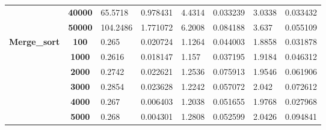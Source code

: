 \documentclass{article}
\begin{document}
\begin{table}[]
\begin{tabular}{|c|c|ll|ll|ll|}
                                           & \textbf{40000}                    & \multicolumn{1}{l|}{65.5718}       & 0.978431                          & \multicolumn{1}{l|}{4.4314}        & 0.033239                          & \multicolumn{1}{l|}{3.0338}        & 0.033432                          \\ \cline{2-8} 
                                           & \textbf{50000}                    & \multicolumn{1}{l|}{104.2486}      & 1.771072                          & \multicolumn{1}{l|}{6.2008}        & 0.084188                          & \multicolumn{1}{l|}{3.637}         & 0.055109                          \\ \hline
\multirow{15}{*}{\textbf{Merge\_sort}}     & \textbf{100}                      & \multicolumn{1}{l|}{0.265}         & 0.020724                          & \multicolumn{1}{l|}{1.1264}        & 0.044003                          & \multicolumn{1}{l|}{1.8858}        & 0.031878                          \\ \cline{2-8} 
                                           & \textbf{1000}                     & \multicolumn{1}{l|}{0.2616}        & 0.018147                          & \multicolumn{1}{l|}{1.157}         & 0.037195                          & \multicolumn{1}{l|}{1.9184}        & 0.046312                          \\ \cline{2-8} 
                                           & \textbf{2000}                     & \multicolumn{1}{l|}{0.2742}        & 0.022621                          & \multicolumn{1}{l|}{1.2536}        & 0.075913                          & \multicolumn{1}{l|}{1.9546}        & 0.061906                          \\ \cline{2-8} 
                                           & \textbf{3000}                     & \multicolumn{1}{l|}{0.2854}        & 0.023628                          & \multicolumn{1}{l|}{1.2242}        & 0.057072                          & \multicolumn{1}{l|}{2.042}         & 0.072612                          \\ \cline{2-8} 
                                           & \textbf{4000}                     & \multicolumn{1}{l|}{0.267}         & 0.006403                          & \multicolumn{1}{l|}{1.2038}        & 0.051655                          & \multicolumn{1}{l|}{1.9768}        & 0.027968                          \\ \cline{2-8} 
                                           & \textbf{5000}                     & \multicolumn{1}{l|}{0.268}         & 0.004301                          & \multicolumn{1}{l|}{1.2808}        & 0.052599                          & \multicolumn{1}{l|}{2.0426}        & 0.094841                          \\ \cline{2-8} 

\end{tabular}
\end{table}
\end{document}
